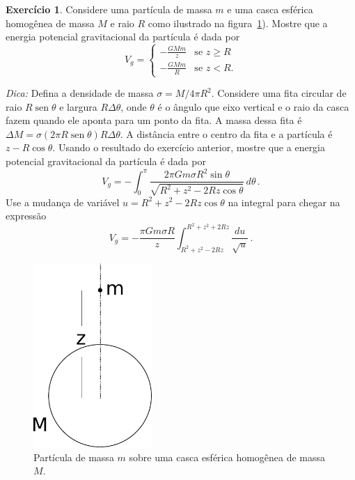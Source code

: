 \documentclass[papersize=a4,DIV=calc,twocolumn=on]{scrartcl}
\theoremstyle{definition}
\newtheorem{ex}{Exercício}[section]
\DeclareMathOperator{\sen}{sen}
\begin{document}
\begin{ex}
  \label{ex:potencial.casca}
  Considere uma partícula de massa $m$ e uma casca esférica homogênea
  de massa $M$ e raio $R$ como ilustrado na
  figura~\ref{fig:potencial_esfera}). Mostre que a energia potencial
  gravitacional da partícula é dada por
  $$V_g=
  \begin{cases}
    -\frac{GMm}{z}&\text{se $z\ge R$}\\
    -\frac{GMm}{R}&\text{se $z<R$.}
  \end{cases}
  $$

  \noindent\textit{Dica:} Defina a densidade de massa
  $\sigma=M/4\pi R^2$. Considere uma fita circular de raio
  $R\sen\theta$ e largura $R\Delta\theta$, onde $\theta$ é o ângulo
  que eixo vertical e o raio da casca fazem quando ele aponta para um
  ponto da fita. A massa dessa fita é
  $\Delta M=\sigma(2\pi R\sen\theta)R\Delta\theta$. A distância entre
  o centro da fita e a partícula é $z-R\cos\theta$. Usando o resultado
  do exercício anterior, mostre que a energia potencial gravitacional
  da partícula é dada por
  $$V_g=-\int_0^{\pi}\frac{2\pi Gm\sigma R^2\sin\theta}{\sqrt{R^2+z^2-2Rz\cos\theta}}\,d\theta\,.$$
  Use a mudança de variável $u=R^2+z^2-2Rz\cos\theta$ na integral para
  chegar na expressão
  $$V_g=-\frac{\pi Gm\sigma R}{z}\int_{R^2+z^2-2Rz}^{R^2+z^2+2Rz}\frac{du}{\sqrt{u}}\,.$$
  \begin{figure}[ht]
    \centering
    \includegraphics[width=0.4\textwidth,keepaspectratio]{potencial_esfera.pdf}
    \caption{Partícula de massa $m$ sobre uma casca esférica homogênea
      de massa $M$.}
    \label{fig:potencial_esfera}
  \end{figure}
\end{ex}
\end{document}
